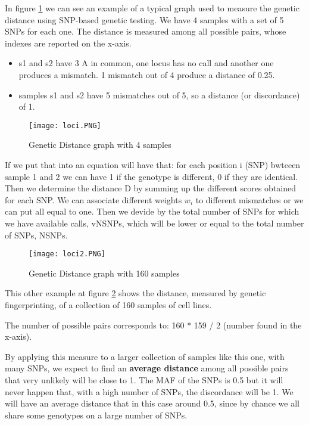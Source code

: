 In figure \ref{fig:Distance} we can see an example of a typical graph used to measure the genetic distance using SNP-based genetic testing. We have 4 samples with a set of 5 SNPs for each one. The distance is measured among all possible pairs, whose indexes are reported on the x-axis.
\begin{itemize}
	\item s1 and s2 have 3 A in common, one locus has no call and another one produces a mismatch. 1 mismatch out of 4 produce a distance of 0.25.
	\item samples s1 and s2 have 5 mismatches out of 5, so a distance (or discordance) of 1.
\end{itemize}

\begin{figure}[H]
	\texttt{[image: loci.PNG]}
	\caption{\label{fig:Distance}Genetic Distance graph with 4 samples}
\end{figure}

If we put that into an equation will have that: for each position i (SNP) bwteeen sample 1 and 2 we can have 1 if the genotype is different, 0 if they are identical. Then we determine the distance D by summing up the different scores obtained for each SNP. We can associate different weights $w_i$ to different mismatches or we can put all equal to one. Then we devide by the total number of SNPs for which we have available calls, vNSNPs, which will be lower or equal to the total number of SNPs, NSNPs.

%
\begin{figure}[H]
	\texttt{[image: loci2.PNG]}
	\caption{\label{fig:Distance2}Genetic Distance graph with 160 samples}
\end{figure}

\bigskip
This other example at figure \ref{fig:Distance2} shows the distance, measured by genetic fingerprinting, of a collection of 160 samples of cell lines.

The number of possible pairs corresponds to: 160 * 159 / 2 (number found in the x-axis).

By applying this measure to a larger collection of samples like this one, with many SNPs, we expect to find an \textbf{average distance} among all possible pairs that very unlikely will be close to 1.
The MAF of the SNPs is 0.5 but it will never happen that, with a high number of SNPs, the discordance will be 1. We will have an average distance that in this case around 0.5, since by chance we all share some genotypes on a large number of SNPs.

